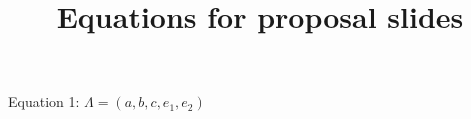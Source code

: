 \documentclass{article}
\title{Equations for proposal slides}
\begin{document}
\maketitle

Equation 1: $ \Lambda = ( a, b, c, e_{1}, e_{2} ) $
\end{document}
